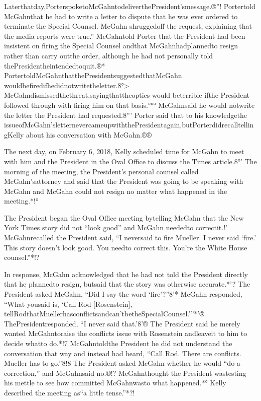 Laterthatday,PorterspoketoMcGahntodeliverthePresident’smessage.®”! Portertold McGahnthat he had to write a letter to dispute that he was ever ordered to terminate the Special Counsel. McGahn shruggedoff the request, explaining that the media reports were true.” McGahntold Porter that the President had been insistent on firing the Special Counsel andthat McGahnhadplannedto resign rather than carry outthe order, although he had not personally told thePresidentheintendedtoquit.®* PortertoldMcGahnthatthePresidentsuggestedthatMcGahn wouldbefiredifhedidnotwritetheletter.8°> McGahndismissedthethreat,sayingthattheoptics would beterrible ifthe President followed through with firing him on that basis.°°° McGahnsaid he would notwrite the letter the President had requested.8”’ Porter said that to his knowledgethe
issueofMcGahn’sletternevercameupwiththePresidentagain,butPorterdidrecalltellingKelly about his conversation with McGahn.®®

The next day, on February 6, 2018, Kelly scheduled time for McGahn to meet with him and the President in the Oval Office to discuss the Times article.8°’ The morning of the meeting, the President’s personal counsel called McGahn’sattorney and said that the President was going to be speaking with McGahn and McGahn could not resign no matter what happened in the meeting.*!°

The President began the Oval Office meeting bytelling McGahn that the New York Times story did not “look good” and McGahn neededto correctit.!' McGahnrecalled the President said, “I neversaid to fire Mueller. I never said ‘fire.’ This story doesn’t look good. You needto correct this. You’re the White House counsel.”*!?

In response, McGahn acknowledged that he had not told the President directly that he plannedto resign, butsaid that the story was otherwise accurate.*'? The President asked McGahn, “Did I say the word ‘fire’?”8'* McGahn responded, “What yousaid is, ‘Call Rod [Rosenstein], tellRodthatMuellerhasconflictsandcan’tbetheSpecialCounsel.’”*'® ThePresidentresponded, “I never said that.’8'® The President said he merely wanted McGahntoraise the conflicts issue with Rosenstein andleaveit to him to decide whatto do.*!7 McGahntoldthe President he did not understand the conversation that way and instead had heard, “Call Rod. There are conflicts. Mueller has to go.”8!8 The President asked McGahn whether he would “do a correction,” and McGahnsaid no.®!? McGahnthought the President wastesting his mettle to see how committed McGahnwasto what happened.*° Kelly described the meeting as“a little tense.”*?!

